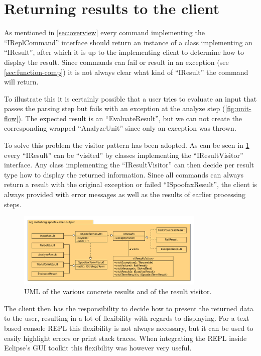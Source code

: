 \section{Returning results to the client}
\label{sec:visitor}

As mentioned in \cref{sec:overview} every command implementing the
``IReplCommand'' interface should return an instance of a class implementing an
``IResult'', after which it is up to the implementing client to determine how
to display the result. Since commands can fail or result in an exception (see
\cref{sec:function-comp}) it is not always clear what kind of ``IResult'' the
command will return.

To illustrate this it is certainly possible that a user tries to evaluate an
input that passes the parsing step but fails with an exception at the analyze
step (\cref{fig:unit-flow}).  The expected result is an ``EvaluateResult'', but
we can not create the corresponding wrapped ``AnalyzeUnit'' since only an
exception was thrown.

To solve this problem the visitor pattern has been adopted. As can be seen in
\cref{fig:uml-visitor} every ``IResult'' can be ``visited'' by classes
implementing the ``IResultVisitor'' interface. Any class implementing the
``IResultVisitor'' can then decide per result type how to display the returned
information. Since all commands can always return a result with the original
exception or failed ``ISpoofaxResult'', the client is always provided with
error messages as well as the results of earlier processing steps.

\begin{figure}[h]
  \centering
  \includegraphics[width=0.8\textwidth]{uml-visitor}
  \caption{UML of the various concrete results and of the result visitor.}
  \label{fig:uml-visitor}
\end{figure}

The client then has the responsibility to decide how to present the returned
data to the user, resulting in a lot of flexibility with regards to displaying.
For a text based console REPL this flexibility is not always necessary, but it
can be used to easily highlight errors or print stack traces. When integrating
the REPL inside Eclipse's GUI toolkit this flexibility was however very useful.
